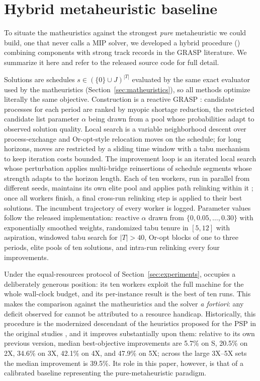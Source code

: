 \section{Hybrid metaheuristic baseline}
\label{sec:metaheuristic}

To situate the matheuristics against the strongest \emph{pure}
metaheuristic we could build, one that never calls a MIP solver, we developed a hybrid procedure (\ILS) combining components with
strong track records in the GRASP literature. We summarize it here
and refer to the released source code for full detail.

Solutions are schedules $s\in(\{0\}\cup J)^{|T|}$ evaluated by the
same exact evaluator used by the matheuristics
(Section~\ref{sec:matheuristics}), so all methods optimize literally
the same objective. Construction is a reactive GRASP
\citep{feo1995greedy,prais2000reactive}: candidate processes for each
period are ranked by myopic shortage reduction, the restricted
candidate list parameter $\alpha$ being drawn from a pool whose
probabilities adapt to observed solution quality. Local search is a
variable neighborhood descent over process-exchange and Or-opt-style
relocation moves on the schedule; for long horizons, moves are
restricted by a sliding time window with a tabu mechanism to keep
iteration costs bounded. The improvement loop is an iterated local
search \citep{lourenco2010iterated} whose perturbation applies
multi-bridge reinsertions of schedule segments whose strength adapts
to the horizon length. Each of ten workers, run in parallel from
different seeds, maintains its own elite pool and applies path
relinking within it
\citep{laguna1999grasp,resende2016optimization}; once all workers
finish, a final cross-run relinking step is applied to their best
solutions. The incumbent trajectory of every worker is logged.
Parameter values follow the released implementation: reactive
$\alpha$ drawn from $\{0, 0.05, \ldots, 0.30\}$ with exponentially
smoothed weights, randomized tabu tenure in $[5,12]$ with aspiration,
windowed tabu search for $|T|>40$, Or-opt blocks of one to three
periods, elite pools of ten solutions, and intra-run relinking every
four improvements.

Under the equal-resources protocol of
Section~\ref{sec:experiments}, \ILS{} occupies a deliberately
generous position: its ten workers exploit the full machine for the
whole wall-clock budget, and its per-instance result is the best of
ten runs. This makes the comparison against the matheuristics and
the solver \emph{a fortiori}: any deficit observed for \ILS{} cannot
be attributed to a resource handicap. Historically, this procedure
is the modernized descendant of the heuristics proposed for the PSP
in the original studies \citep{luche2009combining}, and it improves substantially upon them:
relative to its own previous version, median best-objective
improvements are 5.7\% on S, 20.5\% on 2X, 34.6\% on 3X, 42.1\% on 4X,
and 47.9\% on 5X; across the large 3X--5X sets the
median improvement is 39.5\%. Its role in this paper, however, is that of a
calibrated baseline representing the pure-metaheuristic paradigm.
